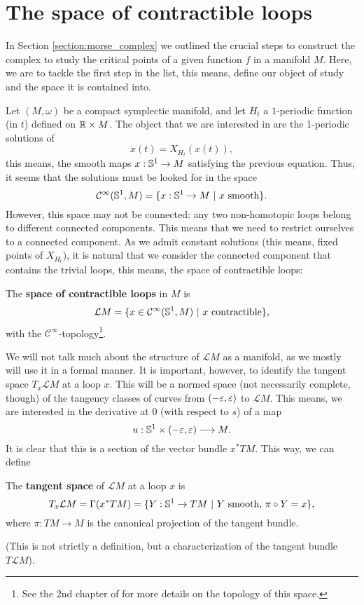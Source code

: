 \section{The space of contractible loops} \label{section:floerq_loops}

In Section \ref{section:morse_complex} we outlined the crucial steps to construct the complex to study the critical points of a given function $f$ in a manifold $M$. Here, we are to tackle the first step in the list, this means, define our object of study and the space it is contained into.

Let $(M,\omega)$ be a compact symplectic manifold, and let $H_t$ a $1$-periodic function (in $t$) defined on $\mathbb{R} \times M$. The object that we are interested in are the 1-periodic solutions of
$$\dot{x}(t) = X_{H_t}(x(t)) ,$$
this means, the smooth maps $x : \mathbb{S}^1 \rightarrow M$ satisfying the previous equation. Thus, it seems that the solutions must be looked for in the space
$$\mathcal{C}^{\infty}(\mathbb{S}^1,M) = \{ x : \mathbb{S}^1 \rightarrow M \ | \ x \text{ smooth} \} .$$
However, this space may not be connected: any two non-homotopic loops belong to different connected components. This means that we need to restrict ourselves to a connected component. As we admit constant solutions (this means, fixed points of $X_{H_t}$), it is natural that we consider the connected component that contains the trivial loops, this means, the space of contractible loops:

\begin{deff}
The {\bf space of contractible loops} in $M$ is
$$\mathcal{L}M = \{ x \in \mathcal{C}^{\infty}(\mathbb{S}^1,M) \ | \ x \text{ contractible} \} ,$$
with the $\mathcal{C}^{\infty}$-topology\footnote{See the 2nd chapter of \cite{hirsch2012differential} for more details on the topology of this space.}.
\end{deff}

We will not talk much about the structure of $\mathcal{L}M$ as a manifold, as we mostly will use it in a formal manner. It is important, however, to identify the tangent space $T_x\mathcal{L}M$ at a loop $x$. This will be a normed space (not necessarily complete, though) of the tangency classes of curves from $(-\varepsilon,\varepsilon)$ to $\mathcal{L}M$. This means, we are interested in the derivative at $0$ (with respect to $s$) of a map
$$u : \mathbb{S}^1 \times (-\varepsilon,\varepsilon) \longrightarrow M .$$
It is clear that this is a section of the vector bundle $x^{\ast}TM$. This way, we can define

\begin{deff}
The {\bf tangent space} of $\mathcal{L}M$ at a loop $x$ is
$$T_x\mathcal{L}M = \Gamma(x^{\ast}TM) = \{ Y : \mathbb{S}^1 \rightarrow TM \ | \ Y \text{ smooth, } \pi \circ Y = x\},$$
where $\pi : TM \rightarrow M$ is the canonical projection of the tangent bundle.
\end{deff}

(This is not strictly a definition, but a characterization of the tangent bundle $T\mathcal{L}M$).
